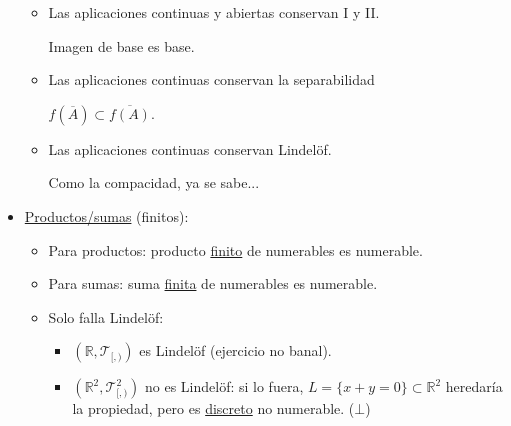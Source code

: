 \begin{demo}
\begin{itemize}
\begin{itemize}
        \item Las aplicaciones continuas y abiertas conservan I y II.
        \begin{demo}
            Imagen de base es base.
        \end{demo}
        \item Las aplicaciones continuas conservan la separabilidad 
        \begin{demo}
            $f\left( \overline{A} \right) \subset \overline{f\left( A \right)}$.
        \end{demo}
        \item Las aplicaciones continuas conservan Lindelöf. 
        \begin{demo}
            Como la compacidad, ya se sabe...
        \end{demo}
    \end{itemize}

    \item \underline{Productos/sumas} (finitos):
    \begin{itemize}
        \item Para productos: producto \underline{finito} de numerables es numerable.
        \item Para sumas: suma \underline{finita} de numerables es numerable.
        \item Solo falla Lindelöf:
        \begin{itemize}
            \item $\left( \mathbb{R}, \mathcal{T}_{[, )} \right)$ es Lindelöf (ejercicio no banal).
            \item $\left( \mathbb{R}^2, \mathcal{T}_{[, )}^2 \right)$ no es Lindelöf: si lo fuera, $L = \{x + y = 0\} \subset \mathbb{R}^2$ heredaría la propiedad, pero es \underline{discreto} no numerable. ($\bot$)
        \end{itemize}
    \end{itemize}
\end{itemize} 
\end{demo}


